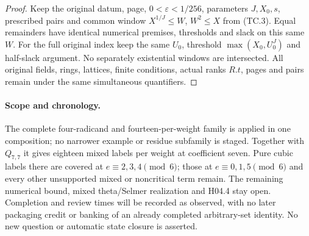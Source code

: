 \begin{proof}
Keep the original datum, page, $0<\varepsilon<1/256$, parameters
$J,X_0,s$, prescribed pairs and common window
$X^{1/J}\leq W$, $W^2\leq X$ from (TC.3).
Equal remainders have identical numerical premises, thresholds and
slack on this same $W$. For the full original index keep the same
$U_0$, threshold $\max(X_0,U_0^J)$ and half-slack argument.
No separately existential windows are intersected. All original
fields, rings, lattices, finite conditions, actual ranks $R.t$,
pages and pairs remain under the same simultaneous quantifiers.
\end{proof}

\paragraph{Scope and chronology.}
The complete four-radicand and fourteen-per-weight family is applied
in one composition; no narrower example or residue subfamily is staged.
Together with $Q_{7,7}$ it gives eighteen mixed labels per weight
at coefficient seven. Pure cubic labels there are covered at
$e\equiv2,3,4\pmod6$; those at $e\equiv0,1,5\pmod6$ and every
other unsupported mixed or noncritical term remain.
The remaining numerical bound, mixed theta/Selmer realization and
H04.4 stay open. Completion and review times will be recorded as
observed, with no later packaging credit or banking of an already
completed arbitrary-set identity. No new question or automatic
state closure is asserted.
